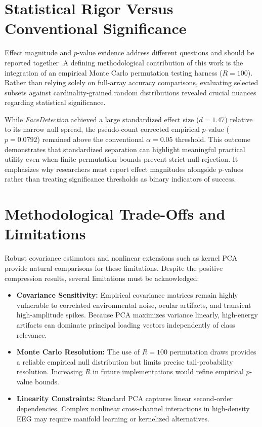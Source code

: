 \section{Statistical Rigor Versus Conventional Significance}
\noindent
Effect magnitude and $p$-value evidence address different questions and
should be reported together
\citep{lakens2013effect,wasserstein2016pvalue}.A defining methodological contribution of this work is the integration of an empirical Monte Carlo permutation testing harness ($R = 100$). Rather than relying solely on full-array accuracy comparisons, evaluating selected subsets against cardinality-grained random distributions revealed crucial nuances regarding statistical significance.

While \textit{FaceDetection} achieved a large standardized effect size ($d = 1.47$) relative to its narrow null spread, the pseudo-count corrected empirical $p$-value ($p = 0.0792$) remained above the conventional $\alpha = 0.05$ threshold. This outcome demonstrates that standardized separation can highlight meaningful practical utility even when finite permutation bounds prevent strict null rejection. It emphasizes why researchers must report effect magnitudes alongside $p$-values rather than treating significance thresholds as binary indicators of success.

\section{Methodological Trade-Offs and Limitations}
\noindent
Robust covariance estimators \citep{ledoit2004covariance} and nonlinear
extensions such as kernel PCA \citep{scholkopf1998kernelpca} provide natural
comparisons for these limitations. Despite the positive compression results, several limitations must be acknowledged:
\begin{itemize}
    \item \textbf{Covariance Sensitivity:} Empirical covariance matrices remain highly vulnerable to correlated environmental noise, ocular artifacts, and transient high-amplitude spikes. Because PCA maximizes variance linearly, high-energy artifacts can dominate principal loading vectors independently of class relevance.
    \item \textbf{Monte Carlo Resolution:} The use of $R = 100$ permutation draws provides a reliable empirical null distribution but limits precise tail-probability resolution. Increasing $R$ in future implementations would refine empirical $p$-value bounds.
    \item \textbf{Linearity Constraints:} Standard PCA captures linear second-order dependencies. Complex nonlinear cross-channel interactions in high-density EEG may require manifold learning or kernelized alternatives.
\end{itemize}